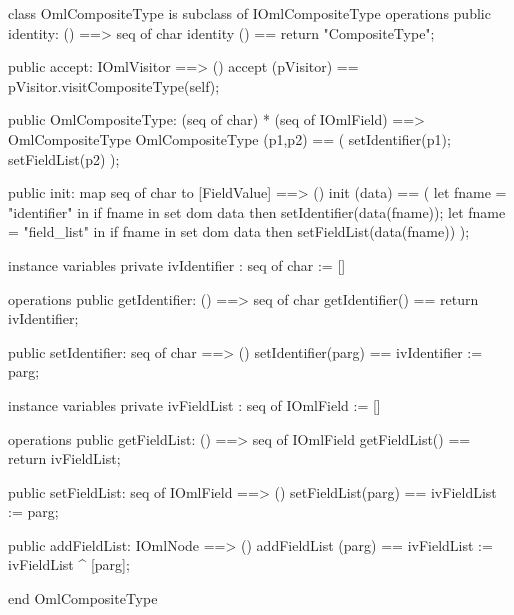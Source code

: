 \begin{vdm_al}
class OmlCompositeType is subclass of IOmlCompositeType
operations
  public identity: () ==> seq of char
  identity () == return "CompositeType";

  public accept: IOmlVisitor ==> ()
  accept (pVisitor) == pVisitor.visitCompositeType(self);

  public OmlCompositeType:
      (seq of char) *
      (seq of IOmlField) ==> OmlCompositeType
  OmlCompositeType (p1,p2) == 
   ( setIdentifier(p1);
     setFieldList(p2) );

  public init: map seq of char to [FieldValue] ==> ()
  init (data) ==
    ( let fname = "identifier" in
        if fname in set dom data
        then setIdentifier(data(fname));
      let fname = "field_list" in
        if fname in set dom data
        then setFieldList(data(fname)) );

instance variables
  private ivIdentifier : seq of char := []

operations
  public getIdentifier: () ==> seq of char
  getIdentifier() == return ivIdentifier;

  public setIdentifier: seq of char ==> ()
  setIdentifier(parg) == ivIdentifier := parg;

instance variables
  private ivFieldList : seq of IOmlField := []

operations
  public getFieldList: () ==> seq of IOmlField
  getFieldList() == return ivFieldList;

  public setFieldList: seq of IOmlField ==> ()
  setFieldList(parg) == ivFieldList := parg;

  public addFieldList: IOmlNode ==> ()
  addFieldList (parg) == ivFieldList := ivFieldList ^ [parg];

end OmlCompositeType
\end{vdm_al}

